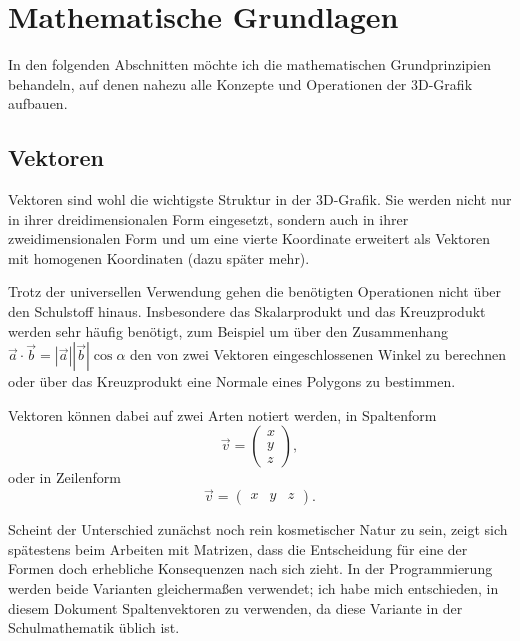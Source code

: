 \chapter{Mathematische Grundlagen}
In den folgenden Abschnitten möchte ich die mathematischen Grundprinzipien behandeln, auf denen nahezu alle Konzepte und Operationen der 3D-Grafik aufbauen.

\section{Vektoren}
Vektoren sind wohl die wichtigste Struktur in der 3D-Grafik. Sie werden nicht nur in ihrer dreidimensionalen Form eingesetzt, sondern auch in ihrer zweidimensionalen Form und um eine vierte Koordinate erweitert als Vektoren mit homogenen Koordinaten (dazu später mehr).

Trotz der universellen Verwendung gehen die benötigten Operationen nicht über den Schulstoff hinaus. Insbesondere das Skalarprodukt und das Kreuzprodukt werden sehr häufig benötigt, zum Beispiel um über den Zusammenhang
$\vec{a}\cdot\vec{b} = \left|\vec{a}\right|\left|\vec{b}\right|\cos\alpha$
den von zwei Vektoren eingeschlossenen Winkel zu berechnen oder über das Kreuzprodukt eine Normale eines Polygons zu bestimmen.

Vektoren können dabei auf zwei Arten notiert werden, in Spaltenform
\begin{equation*}
 \vec{v} = \begin{pmatrix} x \\ y \\ z \end{pmatrix},
\end{equation*}
oder in Zeilenform
\begin{equation*}
 \vec{v} = \begin{pmatrix} x & y & z \end{pmatrix}.
\end{equation*}

Scheint der Unterschied zunächst noch rein kosmetischer Natur zu sein, zeigt sich spätestens beim Arbeiten mit Matrizen, dass die Entscheidung für eine der Formen doch erhebliche Konsequenzen nach sich zieht. In der Programmierung werden beide Varianten gleichermaßen verwendet; ich habe mich entschieden, in diesem Dokument Spaltenvektoren zu verwenden, da diese Variante in der Schulmathematik üblich ist.

